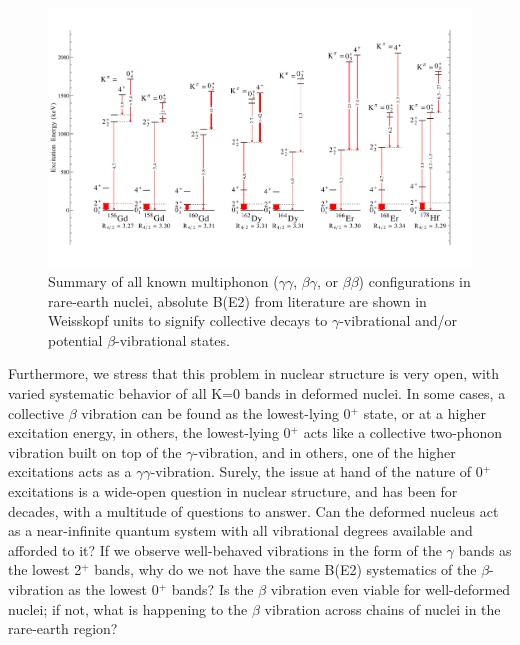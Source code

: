 \begin{landscape}
\begin{figure}[ht] 
\begin{center}
\includegraphics[height=0.8\textheight]{Multiphonon_RareEarths.pdf}
\caption{Summary of all known multiphonon ($\gamma\gamma$, $\beta\gamma$, or $\beta\beta$) configurations in rare-earth nuclei, absolute B(E2) from literature are shown in Weisskopf units to signify collective decays to $\gamma$-vibrational and/or potential $\beta$-vibrational states.
\label{fig:RareEarth_Multiphonon}}
\end{center}
\end{figure}
\end{landscape}

Furthermore, we stress that this problem in nuclear structure is very open, with varied systematic behavior of all K=0 bands in deformed nuclei. In some cases, a collective $\beta$ vibration can be found as the lowest-lying 0$^+$ state, or at a higher excitation energy, in others, the lowest-lying 0$^+$ acts like a collective two-phonon vibration built on top of the $\gamma$-vibration, and in others, one of the higher excitations acts as a $\gamma\gamma$-vibration. Surely, the issue at hand of the nature of 0$^+$ excitations is a wide-open question in nuclear structure, and has been for decades, with a multitude of questions to answer. Can the deformed nucleus act as a near-infinite quantum system with all vibrational degrees available and afforded to it? If we observe well-behaved vibrations in the form of the $\gamma$ bands as the lowest 2$^+$ bands, why do we not have the same B(E2) systematics of the $\beta$-vibration as the lowest 0$^+$ bands? Is the $\beta$ vibration even viable for well-deformed nuclei; if not, what is happening to the $\beta$ vibration across chains of nuclei in the rare-earth region? 


